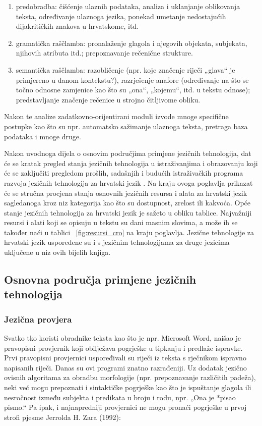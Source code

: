 \begin{multicols}{2}
\begin{enumerate}
\item predobradba: čišćenje ulaznih podataka, analiza i uklanjanje oblikovanja teksta, određivanje ulaznoga jezika, ponekad umetanje nedostajućih dijakritičkih znakova u hrvatskome, itd.
\item gramatička raščlamba: pronalaženje glagola i njegovih objekata, subjekata, njihovih atributa itd.; prepoznavanje rečenične strukture.
\item semantička raščlamba: razobličenje (npr. koje značenje riječi „glava“ je primjereno u danom kontekstu?), razrješenje anafore (određivanje na što se točno odnosne zamjenice kao što su „ona“, „kojemu“, itd. u tekstu odnose); predstavljanje značenje rečenice u strojno čitljivome obliku.
\end{enumerate}

Nakon te analize zadatkovno-orijentirani moduli izvode mnoge specifične postupke kao što su npr. automatsko sažimanje ulaznoga teksta, pretraga baza podataka i mnoge druge.

Nakon uvodnoga dijela o osnovim područjima primjene jezičnih tehnologija, dat će se kratak pregled stanja jezičnih tehnologija u istraživanjima i obrazovanju koji će se zaključiti pregledom prošlih, sadašnjih i budućih istraživačkih programa razvoja jezičnih tehnologija za hrvatski jezik \cite{boo5}. Na kraju ovoga poglavlja prikazat će se stručna procjena stanja osnovnih jezičnih resursa i alata za hrvatski jezik sagledanoga kroz niz kategorija kao što su dostupnost, zrelost ili kakvoća. Opće stanje jezičnih tehnologija za hrvatski jezik je sažeto u obliku tablice. Najvažniji resursi i alati koji se opisuju u tekstu su dani masnim slovima, a može ih se također naći u tablici ~\ref{fig:resursi_cro} na kraju poglavlja. Jezične tehnologije za hrvatski jezik uspoređene su i s jezičnim tehnologijama za druge jezicima uključene u niz ovih bijelih knjiga.

\subsection{Osnovna područja primjene jezičnih tehnologija} 

\subsubsection{Jezična provjera}

Svatko tko koristi obradnike teksta kao što je npr. Microsoft Word, naišao je pravopisni provjernik koji obilježava pogrješke u tipkanju i predlaže ispravke. Prvi pravopisni provjernici uspoređivali su riječi iz teksta s rječnikom ispravno napisanih riječi. Danas su ovi programi znatno razrađeniji. Uz dodatak jezično ovisnih algoritama za obradbu morfologije (npr. prepoznavanje različitih padeža), neki već mogu prepoznati i sintaktičke pogrješke kao što je ispuštanje glagola ili nesročnost između subjekta i predikata u broju i rodu, npr. „Ona je *pisao pismo.“ Pa ipak, i najnapredniji provjernici ne mogu pronaći pogrješke u prvoj strofi pjesme Jerrolda H. Zara (1992):


\end{multicols}
